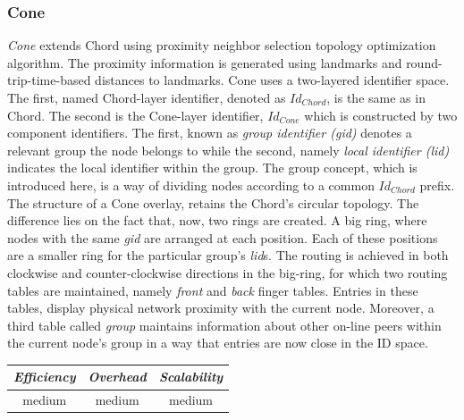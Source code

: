 \subsubsection{Cone}
\emph{Cone} \cite{HY2007} extends Chord using proximity neighbor
selection topology optimization algorithm. The proximity information is
generated using landmarks and round-trip-time-based distances to landmarks.
Cone uses a two-layered identifier space. The first, named Chord-layer
identifier, denoted as $Id_{Chord}$, is the same as in Chord. The second is the
Cone-layer identifier, $Id_{Cone}$ which is constructed by two component
identifiers. The first, known as \emph{group identifier (gid)} denotes a
relevant group the node belongs to while the second, namely \emph{local
identifier (lid)} indicates the local identifier within the group. The group
concept, which is introduced here, is a way of dividing nodes according to a
common $Id_{Chord}$ prefix.  The structure of a Cone overlay, retains the
Chord's circular topology. The difference lies on the fact that, now, two rings
are created. A big ring, where nodes with the same \emph{gid} are arranged at
each position. Each of these positions are a smaller ring for the particular
group's \emph{lid}s. The routing is achieved in both clockwise and
counter-clockwise directions in the big-ring, for which two routing tables are
maintained, namely \emph{front} and \emph{back} finger tables. Entries in these
tables, display physical network proximity with the current node. Moreover, a
third table called \emph{group} maintains information about other on-line peers
within the current node's group in a way that entries are now close in the ID
space.

%
%

\begin{center}
\begin{tabular}{ccc}
\emph{Efficiency} & \emph{Overhead} & \emph{Scalability} \\
\hline
medium &
medium &
medium
\end{tabular}
\end{center}

